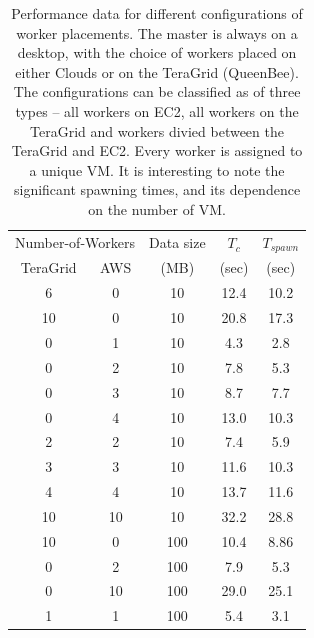\documentclass[conference,final]{IEEEtran}
\newcommand{\upp}{\vspace*{-0.5em}}
\begin{document}
\begin{table}
\upp
\begin{tabular}{ccccc}
  \hline
  \multicolumn{2}{c}{Number-of-Workers}  &  Data size   &  $T_c$  & $T_{spawn}$ \\   
  TeraGrid &  AWS &   (MB)  & (sec) & (sec)  \\
  \hline
  6 & 0 & 10  &  12.4 &  10.2 \\
  10 & 0 & 10  & 20.8 & 17.3 \\  
  \hline 
  0 & 1 & 10 & 4.3 & 2.8 \\
  0 & 2 & 10 & 7.8 & 5.3 \\ 
  0 & 3 & 10 & 8.7 & 7.7 \\
  0 & 4 & 10 & 13.0 & 10.3 \\
  \hline 
  2 & 2 & 10 & 7.4 & 5.9 \\
  3 & 3 & 10 & 11.6 & 10.3 \\
  4 & 4 & 10 & 13.7 & 11.6 \\
  10 & 10 & 10 & 32.2 & 28.8 \\
  \hline
  \hline 
  10 & 0 & 100 & 10.4 & 8.86 \\
  0 & 2 & 100 & 7.9 & 5.3 \\
  0 & 10 & 100 &  29.0 & 25.1 \\
  1 & 1 & 100 & 5.4 & 3.1 \\
  \hline \hline
\end{tabular}
\upp
\caption{Performance data for different configurations of worker placements. The master is always on a desktop, with the choice of workers placed on either Clouds or on the TeraGrid (QueenBee). The configurations can be classified as of three types -- all workers on EC2, all workers on the TeraGrid and workers divied between the TeraGrid and EC2. Every worker is assigned to a unique  VM. It is interesting to note the significant spawning times, and its dependence on the number of VM.}
\label{stuff}
\upp
\upp
\end{table}
\end{document}
